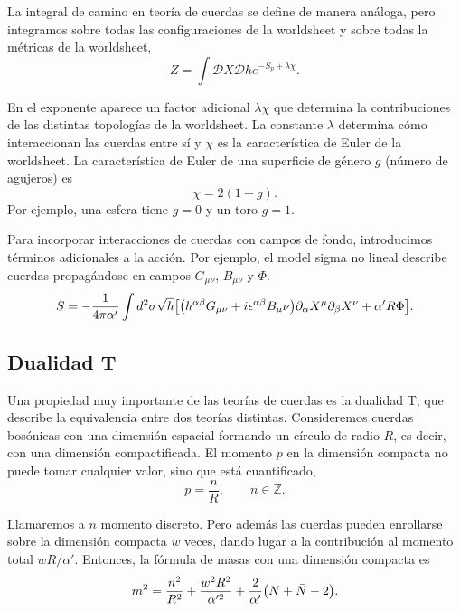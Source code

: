 La integral de camino en teoría de cuerdas se define de manera análoga, pero integramos 
sobre todas las configuraciones  de la worldsheet y sobre todas la métricas de la worldsheet,
\begin{equation}
  Z = \int \mathcal DX \mathcal Dh e^{-S_p+\lambda \chi}.
\end{equation}

En el exponente aparece un factor adicional $\lambda\chi$ que determina la
contribuciones de las distintas topologías de la worldsheet.
La constante $\lambda$ determina cómo interaccionan las cuerdas entre sí y $\chi$ es la característica
de Euler de la worldsheet.
La característica de Euler de una superficie de género $g$ (número de agujeros) es
\begin{equation}
  \chi = 2(1-g).
\end{equation}
Por ejemplo, una esfera tiene $g=0$ y un toro $g=1$.

Para incorporar interacciones de cuerdas con campos de fondo, introducimos términos adicionales a la acción.
Por ejemplo, el model sigma no lineal describe cuerdas propagándose en campos $G_{\mu\nu}$, $B_{\mu\nu}$ y $\Phi$.
\begin{equation}
  S = -\frac{1}{4\pi \alpha'}\int d^2 \sigma \sqrt h \qty[\qty(h^{\alpha\beta}G_{\mu\nu} + i\epsilon^{\alpha\beta}B_\mu\nu)\partial_\alpha X^\mu
  \partial_\beta X^\nu +\alpha'R\Phi].
\end{equation}

\subsection{Dualidad T}
\label{sec:dual}
Una propiedad muy importante de las teorías de cuerdas es la dualidad T,
que describe la equivalencia entre dos teorías distintas.
Consideremos cuerdas bosónicas con una dimensión espacial formando un círculo de radio $R$,
es decir, con una dimensión compactificada.
El momento $p$ en la dimensión compacta no puede tomar cualquier valor, sino que está cuantificado,
\begin{equation}
  p = \frac{n}{R}, \qquad n \in \mathbb Z.
\end{equation}

Llamaremos a $n$ momento discreto.
Pero además las cuerdas pueden enrollarse sobre la dimensión compacta $w$ veces, dando lugar
a la contribución al momento total $wR/\alpha'$.
Entonces, la fórmula de masas con una dimensión compacta es
\begin{equation}
  m^2 = \frac{n^2}{R^2} + \frac{w^2 R^2}{\alpha'^2} +\frac{2}{\alpha'}\qty(N+\bar N -2).
\end{equation}

